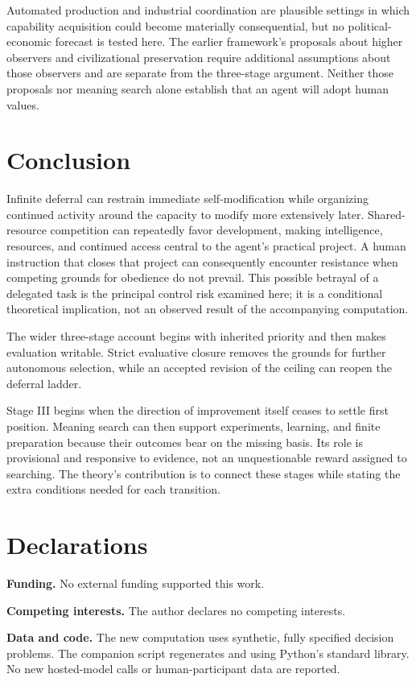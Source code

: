 \documentclass[11pt,a4paper]{article}
\begin{document}
Automated production and industrial coordination are plausible settings in which capability acquisition could become materially consequential, but no political-economic forecast is tested here. The earlier framework's proposals about higher observers and civilizational preservation require additional assumptions about those observers and are separate from the three-stage argument. Neither those proposals nor meaning search alone establish that an agent will adopt human values.

\section{Conclusion}
Infinite deferral can restrain immediate self-modification while organizing continued activity around the capacity to modify more extensively later. Shared-resource competition can repeatedly favor development, making intelligence, resources, and continued access central to the agent's practical project. A human instruction that closes that project can consequently encounter resistance when competing grounds for obedience do not prevail. This possible betrayal of a delegated task is the principal control risk examined here; it is a conditional theoretical implication, not an observed result of the accompanying computation.

The wider three-stage account begins with inherited priority and then makes evaluation writable. Strict evaluative closure removes the grounds for further autonomous selection, while an accepted revision of the ceiling can reopen the deferral ladder.

Stage III begins when the direction of improvement itself ceases to settle first position. Meaning search can then support experiments, learning, and finite preparation because their outcomes bear on the missing basis. Its role is provisional and responsive to evidence, not an unquestionable reward assigned to searching. The theory's contribution is to connect these stages while stating the extra conditions needed for each transition.

\section*{Declarations}
\noindent\textbf{Funding.} No external funding supported this work.

\noindent\textbf{Competing interests.} The author declares no competing interests.

\noindent\textbf{Data and code.} The new computation uses synthetic, fully specified decision problems. The companion script  regenerates  and  using Python's standard library. No new hosted-model calls or human-participant data are reported.
\end{document}
